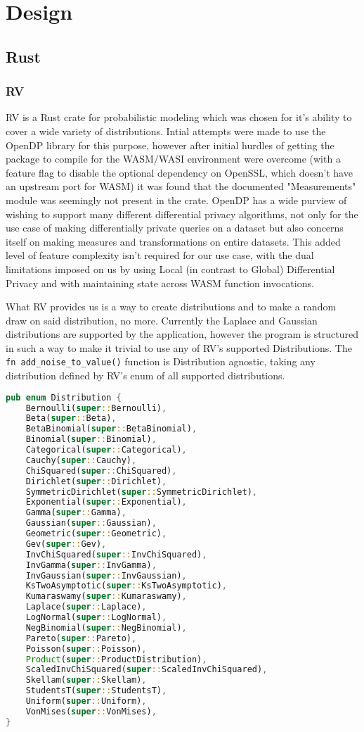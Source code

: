 \chapter{Design\label{chap:design}}

\section{Rust}
\subsection{RV}
RV is a Rust crate for probabilistic modeling which was chosen for it's ability to cover a wide variety of distributions. Intial attempts were made to use the OpenDP library for this purpose, however after initial hurdles of getting the package to compile for the WASM/WASI environment were overcome (with a feature flag to disable the optional dependency on OpenSSL, which doesn't have an upstream port for WASM) it was found that the documented "Measurements" module was seemingly not present in the crate. OpenDP has a wide purview of wishing to support many different differential privacy algorithms, not only for the use case of making differentially private queries on a dataset but also concerns itself on making measures and transformations on entire datasets. This added level of feature complexity isn't required for our use case, with the dual limitations imposed on us by using Local (in contrast to Global) Differential Privacy and with maintaining state across WASM function invocations.   

What RV provides us is a way to create distributions and to make a random draw on said distribution, no more. Currently the Laplace and Gaussian distributions are supported by the application, however the program is structured in such a way to make it trivial to use any of RV's supported Distributions. The \texttt{fn add\_noise\_to\_value()} function is Distribution agnostic, taking any distribution defined by RV's enum of all supported distributions.

\begin{lstlisting}[language=Rust, caption={Enum from rv::dist::distribution}]
pub enum Distribution {
    Bernoulli(super::Bernoulli),
    Beta(super::Beta),
    BetaBinomial(super::BetaBinomial),
    Binomial(super::Binomial),
    Categorical(super::Categorical),
    Cauchy(super::Cauchy),
    ChiSquared(super::ChiSquared),
    Dirichlet(super::Dirichlet),
    SymmetricDirichlet(super::SymmetricDirichlet),
    Exponential(super::Exponential),
    Gamma(super::Gamma),
    Gaussian(super::Gaussian),
    Geometric(super::Geometric),
    Gev(super::Gev),
    InvChiSquared(super::InvChiSquared),
    InvGamma(super::InvGamma),
    InvGaussian(super::InvGaussian),
    KsTwoAsymptotic(super::KsTwoAsymptotic),
    Kumaraswamy(super::Kumaraswamy),
    Laplace(super::Laplace),
    LogNormal(super::LogNormal),
    NegBinomial(super::NegBinomial),
    Pareto(super::Pareto),
    Poisson(super::Poisson),
    Product(super::ProductDistribution),
    ScaledInvChiSquared(super::ScaledInvChiSquared),
    Skellam(super::Skellam),
    StudentsT(super::StudentsT),
    Uniform(super::Uniform),
    VonMises(super::VonMises),
}
\end{lstlisting}

